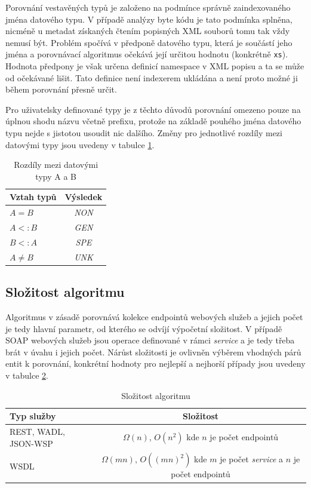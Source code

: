 \documentclass[czech,DP]{thesiskiv}
\begin{document}
Porovnání vestavěných typů je založeno na podmínce správně zaindexovaného jména datového typu. V případě analýzy byte kódu je tato podmínka splněna, nicméně u metadat získaných čtením popisných XML souborů tomu tak vždy nemusí být. Problém spočívá v  předponě datového typu, která je součástí jeho jména a porovnávací algoritmus očekává její určitou hodnotu (konkrétně \verb|xs|). Hodnota předpony je však určena definicí namespace v XML popisu a ta se může od očekávané lišit. Tato definice není indexerem ukládána a není proto možné ji během porovnání přesně určit.

Pro uživatelsky definované typy je z těchto důvodů porovnání omezeno pouze na úplnou shodu názvu včetně prefixu, protože na základě pouhého jména datového typu nejde s jistotou usoudit nic dalšího. Změny pro jednotlivé rozdíly mezi datovými typy jsou uvedeny v tabulce \ref{tab:type-cmp}.

\begin{table}[h]
	\centering
	\begin{tabular}{|l|c|}
		\hline
		Vztah typů & Výsledek \\
		\hline
		\hline
		$ A = B$ & \textit{NON} \\
		\hline
		$ A <: B$ & \textit{GEN} \\
		\hline
		$ B <: A$ & \textit{SPE} \\
		\hline
		$ A \neq B$ & \textit{UNK} \\
		\hline
	\end{tabular}
	\caption{Rozdíly mezi datovými typy A a B}
	\label{tab:type-cmp}
\end{table}


\subsection{Složitost algoritmu}

Algoritmus v zásadě porovnává kolekce endpointů webových služeb a jejich počet je tedy hlavní parametr, od kterého se odvíjí výpočetní složitost. V případě SOAP webových služeb jsou operace definované v rámci \textit{service} a je tedy třeba brát v úvahu i jejich počet. Nárůst složitosti je ovlivněn výběrem vhodných párů entit k porovnání, konkrétní hodnoty pro nejlepší a nejhorší případy jsou uvedeny v tabulce \ref{tab:alg-complexity}.

\begin{table}[h]
	\centering
	\begin{tabular}{|l|c|}
		\hline
		Typ služby & Složitost \\
		\hline
		\hline
		REST, WADL, JSON-WSP & $\Omega(n)$, $O(n^2)$ kde $n$ je počet endpointů \\
		\hline
		WSDL & \makecell{$\Omega(mn)$, $O((mn)^2)$ kde $m$ je počet \textit{service}\\ a $n$ je počet endpointů} \\
		\hline
	\end{tabular}
	\caption{Složitost algoritmu}
	\label{tab:alg-complexity}
\end{table}
	
\end{document}
